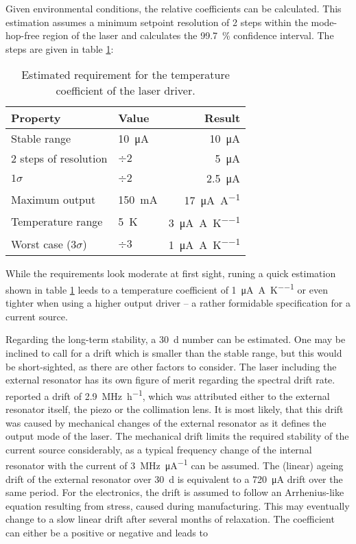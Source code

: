 Given environmental conditions, the relative coefficients can be calculated. This estimation assumes a minimum setpoint resolution of 2 steps within the mode-hop-free region of the laser and calculates the \qty{99.7}{\percent} confidence interval. The steps are given in table \ref{tab:dgdrive_tempco}:

\begin{table}[hb]
    \centering
    \begin{tabular}{llr}
        \toprule
        Property& Value& Result \\
        \midrule
        Stable range & \qty{10}{\uA}& \qty{10}{\uA}\\
        2 steps of resolution  & $\div 2$& \qty{5}{\uA} \\
        $1 \sigma$  & $\div 2$& \qty{2.5}{\uA} \\
        Maximum output& \qty{150}{\mA}& \qty{17}{\uA \per \A}\\
        Temperature range& \qty{5}{\K}& \qty{3}{\uA \per \A \per \K}\\
        Worst case ($3 \sigma$)& $\div 3$& \qty{1}{\uA \per \A \per \K}\\
        \bottomrule
    \end{tabular}
    \caption{Estimated requirement for the temperature coefficient of the laser driver.}
    \label{tab:dgdrive_tempco}
\end{table}

While the requirements look moderate at first sight, runing a quick estimation shown in table \ref{tab:dgdrive_tempco} leeds to a temperature coefficient of \qty[per-mode = symbol]{1}{\uA \per \A \per \K} or even tighter when using a higher output driver -- a rather formidable specification for a current source.

Regarding the long-term stability, a \qty{30}{\day} number can be estimated. One may be inclined to call for a drift which is smaller than the stable range, but this would be short-sighted, as there are other factors to consider. The laser including the external resonator has its own figure of merit regarding the spectral drift rate. \citeauthor{ecdl_stability} \cite{ecdl_stability} reported a drift of \qty{2.9}{\MHz \per \hour}, which was attributed either to the external resonator itself, the piezo or the collimation lens. It is most likely, that this drift was caused by mechanical changes of the external resonator as it defines the output mode of the laser. The mechanical drift limits the required stability of the current source considerably, as a typical frequency change of the internal resonator with the current of \qty[per-mode=symbol]{3}{\MHz \per \micro \A} \cite{diodelaser_modulation} can be assumed. The (linear) ageing drift of the external resonator over \qty{30}{\day} is equivalent to a \qty{720}{\uA} drift over the same period. For the electronics, the drift is assumed to follow an Arrhenius-like equation resulting from stress, caused during manufacturing. This may eventually change to a slow linear drift after several months of relaxation. The coefficient can either be a positive or negative and leads to

